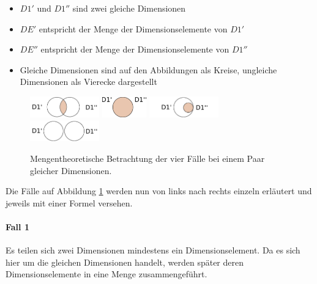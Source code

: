 \documentclass[11pt]{article}
\begin{document}
\begin{itemize}
    \item $D1'$ und $D1''$ sind zwei gleiche Dimensionen
    \item $DE'$ entspricht der Menge der Dimensionselemente von $D1'$
    \item $DE''$ entspricht der Menge der Dimensionselemente von $D1''$
    \item Gleiche Dimensionen sind auf den Abbildungen als Kreise, ungleiche Dimensionen als Vierecke dargestellt\\
\end{itemize}

\begin{figure}[!htb]
    \centering
    \includegraphics[width=3cm]{CaseDifferentiation/GeneralCase_2EqualDim_ShareSomeDe.pdf}
    \label{}
\endminipage\hfill
{}%
    \centering
    \includegraphics[width=1.9cm]{CaseDifferentiation/CaseDifferentiation_1SameDim_AllDePairPartnered.pdf}
    \label{}
\endminipage
{}%
    \centering
    \includegraphics[width=3cm]{CaseDifferentiation/GeneralCase_2EqualDim_DimInDim.pdf}
    \label{}
\endminipage
{}
    \centering
    \includegraphics[width=3cm]{CaseDifferentiation/GeneralCase_2EqualDim.pdf}
    \label{}
\endminipage\hfill
\caption{Mengentheoretische Betrachtung der vier Fälle bei einem Paar gleicher Dimensionen.}
\label{fig:4BasicCases_1DimEqual}
\end{figure}

\noindent
Die Fälle auf Abbildung \ref{fig:4BasicCases_1DimEqual} werden nun von links nach rechts einzeln erläutert und jeweils mit einer Formel versehen.

%
%
\paragraph{Fall 1} Es teilen sich zwei Dimensionen mindestens ein Dimensionselement. Da es sich hier um die gleichen Dimensionen handelt, werden später deren Dimensionselemente in eine Menge zusammengeführt. 
\end{document}
